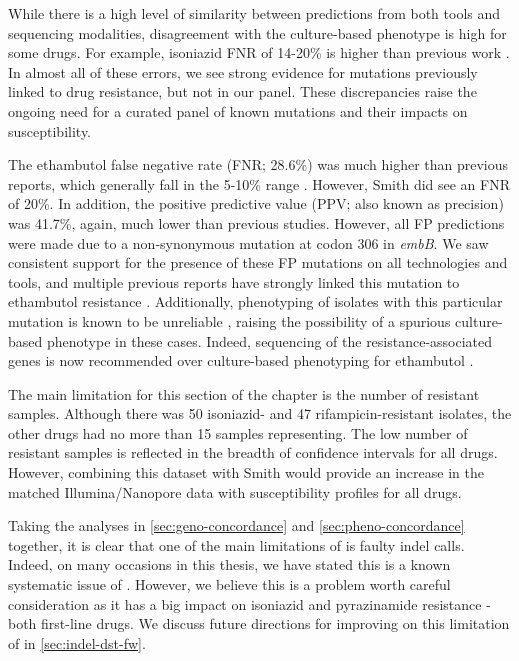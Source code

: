 While there is a high level of similarity between predictions from both tools and sequencing modalities, disagreement with the culture-based phenotype is high for some drugs. For example, isoniazid FNR of 14-20\% is higher than previous work \cite{hunt2019,cryptic2018}. In almost all of these errors, we see strong evidence for mutations previously linked to drug resistance, but not in our panel. These discrepancies raise the ongoing need for a curated panel of known mutations and their impacts on susceptibility. 

The ethambutol false negative rate (FNR; 28.6\%) was much higher than previous reports, which generally fall in the 5-10\% range \cite{cryptic2018,hunt2019,smith2020}. However, Smith \etal{} did see an FNR of 20\%. In addition, the positive predictive value (PPV; also known as precision) was 41.7\%, again, much lower than previous studies. However, all FP predictions were made due to a non-synonymous mutation at codon 306 in \textit{embB}. We saw consistent support for the presence of these FP mutations on all technologies and tools, and multiple previous reports have strongly linked this mutation to ethambutol resistance \cite{Maningi2017,Srivastava2009,Brossier2015}. Additionally, phenotyping of isolates with this particular mutation is known to be unreliable \cite{Zhang2014,walker2015,Sirgel2013}, raising the possibility of a spurious culture-based phenotype in these cases. Indeed, sequencing of the resistance-associated genes is now recommended over culture-based phenotyping for ethambutol \cite{who2018technical}.

The main limitation for this section of the chapter is the number of resistant samples. Although there was 50 isoniazid- and 47 rifampicin-resistant isolates, the other drugs had no more than 15 samples representing. The low number of resistant samples is reflected in the breadth of confidence intervals for all drugs. However, combining this dataset with Smith \etal{} \cite{smith2020} would provide an increase in the matched Illumina/Nanopore data with susceptibility profiles for all drugs.

\noindent
Taking the analyses in \autoref{sec:geno-concordance} and \autoref{sec:pheno-concordance} together, it is clear that one of the main limitations of \drprg{} is faulty indel calls. Indeed, on many occasions in this thesis, we have stated this is a known systematic issue of \ont{} \cite{watson2019}. However, we believe this is a problem worth careful consideration as it has a big impact on isoniazid and pyrazinamide resistance - both first-line \mtb{} drugs. We discuss future directions for improving on this limitation of \drprg{} in \autoref{sec:indel-dst-fw}.

